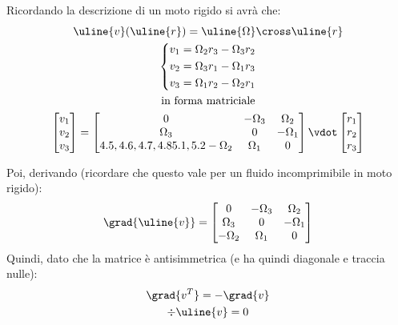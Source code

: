 Ricordando la descrizione di un moto rigido si avrà che:
%
\begin{equation*}
	\begin{gathered}
		\uline{v}(\uline{r}) = \uline{\Omega} \cross \uline{r}\\
			\left\{
				\begin{aligned}
					v_1 = \Omega_2 r_3 - \Omega_3 r_2 \\
					v_2 = \Omega_3 r_1 - \Omega_1 r_3 \\
					v_3 = \Omega_1 r_2 - \Omega_2 r_1
				\end{aligned}
			\right.\\
			\text{in forma matriciale}\\
			\begin{bmatrix}
				v_1 \\ v_2 \\ v_3
			\end{bmatrix} 
			=
			\begin{bmatrix}
				0 & -\Omega_3 & \Omega_2 \\
				\Omega_3 & 0 & - \Omega_1\\4.5, 4.6, 4.7, 4.85.1, 5.2
				-\Omega_2 & \Omega_1 & 0
			\end{bmatrix} 
			\vdot
			\begin{bmatrix}
				r_1 \\ r_2 \\ r_3
			\end{bmatrix} 
	\end{gathered}
\end{equation*}
%

Poi, derivando (ricordare che questo vale per un fluido incomprimibile in moto rigido):
%
	\begin{equation*}
		\grad{\uline{v}} 
		=
		\begin{bmatrix}
			0 & -\Omega_3 & \Omega_2 \\
			\Omega_3 & 0 & - \Omega_1\\
			-\Omega_2 & \Omega_1 & 0
		\end{bmatrix} 
	\end{equation*}
%
Quindi, dato che la matrice è antisimmetrica (e ha quindi diagonale e traccia nulle):
%
	\begin{equation*}
		\begin{gathered}
			\grad{v^T} = - \grad{v}\\
			\div{\uline{v}} = 0
		\end{gathered}
	\end{equation*}
%

